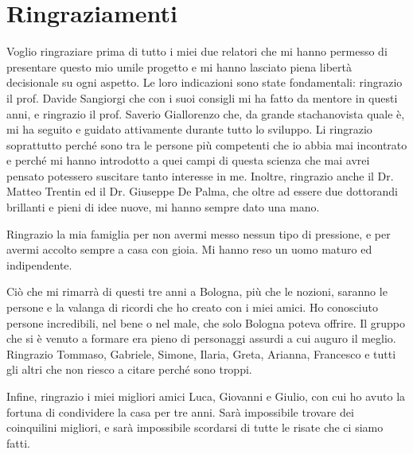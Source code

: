 \cleardoublepage %
{}
\chapter*{Ringraziamenti}
\pagestyle{empty}
\thispagestyle{empty}

Voglio ringraziare prima di tutto i miei due relatori che mi hanno
permesso di presentare questo mio umile progetto e mi hanno lasciato piena
libertà decisionale su ogni aspetto. Le loro indicazioni sono state fondamentali:
ringrazio il prof. Davide Sangiorgi che con i suoi consigli
mi ha fatto da mentore in questi anni, e ringrazio il prof. Saverio Giallorenzo
che, da grande stachanovista quale è, mi ha seguito e guidato attivamente durante
tutto lo sviluppo. Li ringrazio soprattutto perché sono tra le persone più competenti
che io abbia mai incontrato e perché mi hanno introdotto a quei campi di questa scienza
che mai avrei pensato potessero suscitare tanto interesse in me.
Inoltre, ringrazio anche il Dr. Matteo Trentin ed il Dr. Giuseppe De Palma,
che oltre ad essere due dottorandi brillanti e pieni di idee nuove, mi hanno sempre dato una mano.

Ringrazio la mia famiglia per non avermi messo nessun tipo di pressione,
e per avermi accolto sempre a casa con gioia. Mi hanno reso un uomo maturo ed indipendente.

Ciò che mi rimarrà di questi tre anni a Bologna, più che le nozioni,
saranno le persone e la valanga di ricordi che ho creato con i miei amici.
Ho conosciuto persone incredibili, nel bene o nel male, che solo Bologna poteva offrire.
Il gruppo che si è venuto a formare era pieno di personaggi assurdi a cui auguro il meglio.
Ringrazio Tommaso, Gabriele, Simone, Ilaria,  Greta, Arianna, Francesco e tutti gli altri
che non riesco a citare perché sono troppi.

Infine, ringrazio i miei migliori amici Luca, Giovanni e Giulio,
con cui ho avuto la fortuna di condividere la casa per tre anni.
Sarà impossibile trovare dei coinquilini migliori, e sarà impossibile
scordarsi di tutte le risate che ci siamo fatti.

\clearpage
